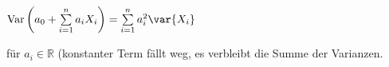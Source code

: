 \documentclass[8pt,a4paper]{scrartcl}
\begin{document}
\begin{multicols*}{3}
\begin{enumerate}
\begin{center}$\text{Var}\left(a_0+\sum\limits_{i=1}^na_iX_i\right)=\sum\limits_{i=1}^na_i^2\var{X_i}$\end{center}

für $a_i\in\mathbb{R}$ (konstanter Term fällt weg, es verbleibt die Summe der Varianzen.
\end{enumerate}




\end{multicols*}
\end{document}
